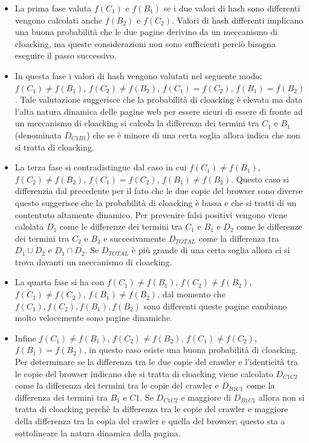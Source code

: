 \begin{itemize}
 \item La prima fase valuta \(f(C_1)\) e \(f(B_1)\) se i due valori di hash sono differenti vengono calcolati anche \(f(B_2)\) e \(f(C_2)\). Valori di hash differenti implicano una buona probabilità che le due pagine derivino da un meccanismo di cloacking, ma queste considerazioni non sono sufficienti perciò bisogna eseguire il passo successivo.
 
 \item In questa fase i valori di hash vengono valutati nel seguente modo: \(f(C_1)\not =f(B_1)\), \(f(C_2)\not=f(B_2)\), \(f(C_1)=f(C_2)\), \(f(B_1)=f(B_2)\). Tale valutazione suggerisce che la probabilità di cloacking è elevata ma data l'alta natura dinamica delle pagine web per essere sicuri di essere di fronte ad un meccanismo di cloacking si calcola la differenza dei termini tra \(C_1\) e \(B_1\) (denominata \(D_{C1B1}\)) che se è minore di una certa soglia allora indica che non si tratta di cloacking.
 
 \item La terza fase si contradistingue dal caso in cui \(f(C_1)\not=f(B_1)\), \(f(C_2)\not=f(B_2)\), \(f(C_1)=f(C_2)\), \(f(B_1)\not=f(B_2)\). Questo caso si differenzia dal precedente per il fato che le due copie del browser sono diverse questo suggerisce che la probabilità di cloacking è bassa e che si tratti di un contentuto altamente dinamico. Per prevenire falsi positivi vengono viene calolata \(D_1\) come le differenze dei termini tra \(C_1\) e \(B_1\) e \(D_2\) come le differenze dei termini tra \(C_2\) e \(B_2\) e succesivamente \(D_{TOTAL}\) come la differenza tra \(D_1\cup D_2\) e \(D_1 \cap D_2\). Se \(D_{TOTAL}\) è più grande di una certa soglia allora ci si trova davanti un meccanismo di cloacking.
 
 \item La quarta fase si ha con \(f(C_1)\not=f(B_1)\), \(f(C_2)\not=f(B_2)\), \(f(C_1)\not=f(C_2)\), \(f(B_1)\not=f(B_2)\), dal momento che \(f(C_1),f(C_2),f(B_1),f(B_2)\) sono differenti queste pagine cambiano molto velocemente sono pagine dinamiche. 
 
 \item Infine \(f(C_1)\not=f(B_1)\), \(f(C_2)\not=f(B_2)\), \(f(C_1)\not=f(C_2)\), \(f(B_1)=f(B_2)\), in questo caso esiste una buona probabilità di cloacking. Per determinare se la differenza tra le due copie del crawler e l'identicità tra le copie del browser indicano che si tratta di cloacking viene calcolato \(D_{C1C2}\) come la differenza dei termini tra le copie del crawler e \(D_{B1C1}\) come la differenza dei termini tra \(B_1\) e \(C1\). Se \(D_{C1C2}\) e maggiore di \(D_{B1C1}\) allora non si tratta di cloacking perchè la differenza tra le copie del crawler e maggiore della differenza tra la copia del crawler e quella del browser; questo sta a sottolineare la natura dinamica della pagina.
\end{itemize}

